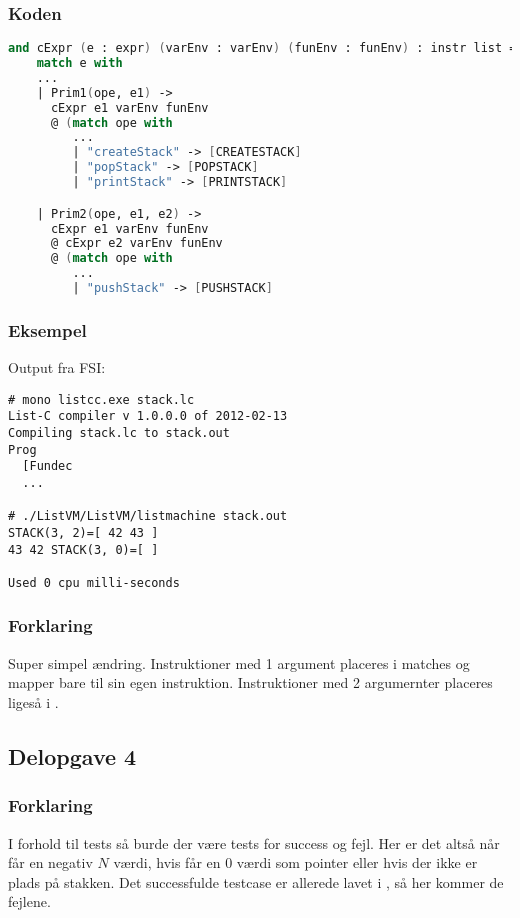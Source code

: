 \subsubsection{Koden}
\begin{lstlisting}[language=fsharp]
and cExpr (e : expr) (varEnv : varEnv) (funEnv : funEnv) : instr list = 
    match e with
    ...
    | Prim1(ope, e1) ->
      cExpr e1 varEnv funEnv
      @ (match ope with
         ...
         | "createStack" -> [CREATESTACK]
         | "popStack" -> [POPSTACK]
         | "printStack" -> [PRINTSTACK]

    | Prim2(ope, e1, e2) ->
      cExpr e1 varEnv funEnv
      @ cExpr e2 varEnv funEnv
      @ (match ope with
         ...
         | "pushStack" -> [PUSHSTACK]
\end{lstlisting}

\subsubsection{Eksempel}
Output fra FSI:
\begin{lstlisting}
# mono listcc.exe stack.lc
List-C compiler v 1.0.0.0 of 2012-02-13
Compiling stack.lc to stack.out
Prog
  [Fundec
  ...

# ./ListVM/ListVM/listmachine stack.out
STACK(3, 2)=[ 42 43 ]
43 42 STACK(3, 0)=[ ]

Used 0 cpu milli-seconds
\end{lstlisting}

\subsubsection{Forklaring}
Super simpel ændring. Instruktioner med 1 argument placeres i  matches og mapper bare til sin egen instruktion. Instruktioner med 2 argumernter placeres ligeså i .


\subsection{Delopgave 4}\label{ass:2-4}
\subsubsection{Forklaring}
I forhold til tests så burde der være tests for success og fejl. Her er det altså når  får en negativ $N$ værdi, hvis  får en 0 værdi som pointer eller hvis der ikke er plads på stakken. Det successfulde testcase er allerede lavet i , så her kommer de fejlene.

